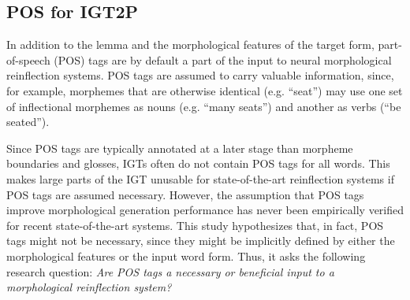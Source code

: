 


\subsection{POS for IGT2P}

In addition to the lemma and the morphological features of the target form, part-of-speech (POS) tags are by default a part of the input to neural morphological reinflection systems. POS tags are assumed to carry valuable information, since, for example, morphemes that are otherwise identical (e.g. ``seat'') may use one set of inflectional morphemes as nouns (e.g. ``many seats'') and another as verbs (``be seated''). 

Since POS tags are typically annotated at a later stage than morpheme boundaries and glosses, IGTs often do not contain POS tags for all words. This makes large parts of the IGT unusable for state-of-the-art reinflection systems if POS tags are assumed necessary. However, the assumption that POS tags improve morphological generation performance has never been empirically verified for recent state-of-the-art systems. This study hypothesizes that, in fact, POS tags might not be necessary, since they might be implicitly defined by either the morphological features or the input word form. 
Thus,
it asks the following research question: \textit{Are POS tags a necessary or beneficial input to a morphological reinflection system?} 

